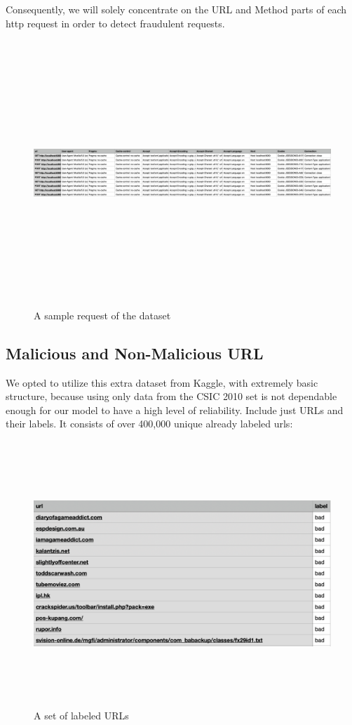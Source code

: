 Consequently, we will solely concentrate on the URL and Method parts of each http request in order to detect fraudulent requests.

\begin{figure}[!h]
	\centering
	\includegraphics[width=\linewidth, height=10cm,keepaspectratio]{figures/dataset2.png}
  \caption{A sample request of the dataset}
\end{figure}

\newpage
\subsection{Malicious and Non-Malicious URL}

We opted to utilize this extra dataset from Kaggle, with extremely basic structure, because using only data from the CSIC 2010 set is not dependable enough for our model to have a high level of reliability. Include just URLs and their labels. It consists of over 400,000 unique already labeled urls:
\begin{figure}[!h]
	\centering
	\includegraphics[width=\linewidth, height=10cm,keepaspectratio]{figures/dataset3.png}
  \caption{A set of labeled URLs}
\end{figure}

